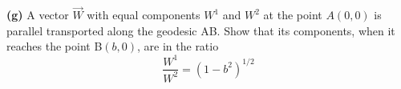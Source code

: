 \documentclass[a4paper]{article} %
\begin{document}

\begin{framed}
\textbf{(g)} A vector $\vec{W}$ with equal components $W^1$ and $W^2$ at the point $A(0,0)$ is parallel transported along the geodesic AB. Show that its components, when it reaches the point B$(b,0)$, are in the ratio
\begin{equation}
\frac{W^1}{W^2}=(1-b^2)^{1/2}
\end{equation}
\end{framed}
\end{document}
